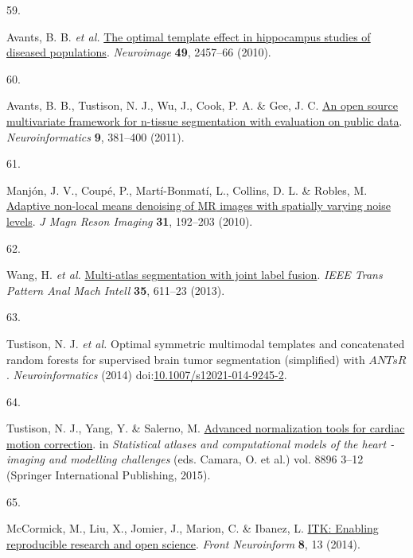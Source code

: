 \documentclass[
  12pt,
]{article}
\newlength{\cslhangindent}
\newlength{\csllabelwidth}
\newenvironment{CSLReferences}[2] %
 {\begin{list}{}{%
  \setlength{\itemindent}{0pt}
  \setlength{\leftmargin}{0pt}
  \setlength{\parsep}{0pt}
  \ifodd #1
   \setlength{\leftmargin}{\cslhangindent}
   \setlength{\itemindent}{-1\cslhangindent}
  \fi
  \setlength{\itemsep}{#2\baselineskip}}}
 {\end{list}}
\newcommand{\CSLLeftMargin}[1]{\parbox[t]{\csllabelwidth}{\strut#1\strut}}
\newcommand{\CSLRightInline}[1]{\parbox[t]{\linewidth - \csllabelwidth}{\strut#1\strut}}
\begin{document}
\begin{CSLReferences}{0}{0}
\CSLLeftMargin{59. }%
\CSLRightInline{Avants, B. B. \emph{et al.}
\href{https://doi.org/10.1016/j.neuroimage.2009.09.062}{The optimal
template effect in hippocampus studies of diseased populations}.
\emph{Neuroimage} \textbf{49}, 2457--66 (2010).}

\CSLLeftMargin{60. }%
\CSLRightInline{Avants, B. B., Tustison, N. J., Wu, J., Cook, P. A. \&
Gee, J. C. \href{https://doi.org/10.1007/s12021-011-9109-y}{An open
source multivariate framework for n-tissue segmentation with evaluation
on public data}. \emph{Neuroinformatics} \textbf{9}, 381--400 (2011).}

\CSLLeftMargin{61. }%
\CSLRightInline{Manjón, J. V., Coupé, P., Martí-Bonmatí, L., Collins, D.
L. \& Robles, M. \href{https://doi.org/10.1002/jmri.22003}{Adaptive
non-local means denoising of {MR} images with spatially varying noise
levels}. \emph{J Magn Reson Imaging} \textbf{31}, 192--203 (2010).}

\CSLLeftMargin{62. }%
\CSLRightInline{Wang, H. \emph{et al.}
\href{https://doi.org/10.1109/TPAMI.2012.143}{Multi-atlas segmentation
with joint label fusion}. \emph{IEEE Trans Pattern Anal Mach Intell}
\textbf{35}, 611--23 (2013).}

\CSLLeftMargin{63. }%
\CSLRightInline{Tustison, N. J. \emph{et al.} Optimal symmetric
multimodal templates and concatenated random forests for supervised
brain tumor segmentation (simplified) with {\(ANTsR\)}.
\emph{Neuroinformatics} (2014)
doi:\href{https://doi.org/10.1007/s12021-014-9245-2}{10.1007/s12021-014-9245-2}.}

\CSLLeftMargin{64. }%
\CSLRightInline{Tustison, N. J., Yang, Y. \& Salerno, M.
\href{https://doi.org/10.1007/978-3-319-14678-2_1}{Advanced
normalization tools for cardiac motion correction}. in \emph{Statistical
atlases and computational models of the heart - imaging and modelling
challenges} (eds. Camara, O. et al.) vol. 8896 3--12 (Springer
International Publishing, 2015).}

\CSLLeftMargin{65. }%
\CSLRightInline{McCormick, M., Liu, X., Jomier, J., Marion, C. \&
Ibanez, L. \href{https://doi.org/10.3389/fninf.2014.00013}{ITK: Enabling
reproducible research and open science}. \emph{Front Neuroinform}
\textbf{8}, 13 (2014).}


\end{CSLReferences}
\end{document}
